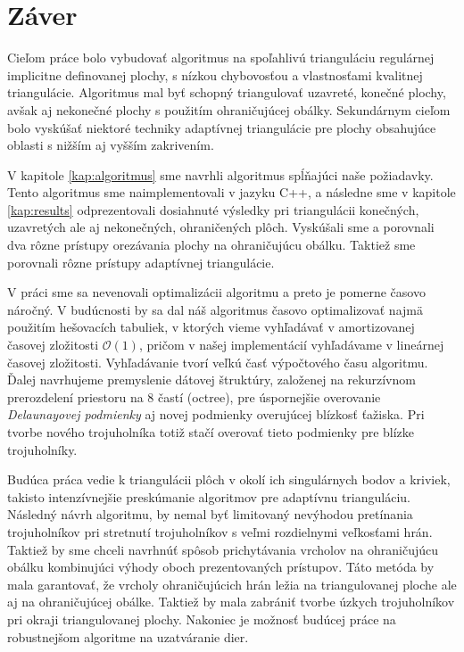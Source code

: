\chapter*{Záver}  %

Cieľom práce bolo vybudovať algoritmus na spoľahlivú trianguláciu regulárnej implicitne definovanej plochy, 
s nízkou chybovosťou a vlastnosťami kvalitnej triangulácie. Algoritmus mal byť schopný triangulovať
uzavreté, konečné plochy, avšak aj nekonečné plochy s použitím ohraničujúcej obálky. Sekundárnym cieľom bolo
vyskúšať niektoré techniky adaptívnej triangulácie pre plochy obsahujúce oblasti s nižším aj vyšším zakrivením.

V kapitole \ref{kap:algoritmus} sme navrhli algoritmus spĺňajúci naše požiadavky. Tento algoritmus sme
naimplementovali v jazyku C++, a následne sme v kapitole \ref{kap:results} odprezentovali dosiahnuté výsledky
pri triangulácii konečných, uzavretých ale aj nekonečných, ohraničených plôch. Vyskúšali sme a porovnali dva 
rôzne prístupy orezávania plochy na ohraničujúcu obálku. Taktiež sme porovnali rôzne prístupy adaptívnej 
triangulácie. 

V práci sme sa nevenovali optimalizácii algoritmu a preto je pomerne časovo náročný. V budúcnosti by 
sa dal náš algoritmus časovo optimalizovať najmä použitím hešovacích tabuliek, v ktorých vieme vyhľadávať 
v amortizovanej časovej zložitosti $\mathcal{O}(1)$, pričom v našej implementácií vyhľadávame v lineárnej časovej
zložitosti. Vyhľadávanie tvorí veľkú časť výpočtového času algoritmu. Ďalej navrhujeme 
premyslenie dátovej štruktúry, založenej na rekurzívnom prerozdelení priestoru na 8 častí (octree), pre 
úspornejšie overovanie \textit{Delaunayovej podmienky} aj novej podmienky overujúcej blízkosť ťažiska.
Pri tvorbe nového trojuholníka totiž stačí overovať tieto podmienky pre blízke trojuholníky.

Budúca práca vedie k triangulácii plôch v okolí ich singulárnych bodov a kriviek, takisto intenzívnejšie 
preskúmanie algoritmov pre adaptívnu trianguláciu. Následný návrh algoritmu, by nemal byť limitovaný nevýhodou pretínania
trojuholníkov pri stretnutí trojuholníkov s veľmi rozdielnymi veľkosťami hrán. Taktiež by sme chceli navrhnúť spôsob 
prichytávania vrcholov na ohraničujúcu obálku kombinujúci výhody oboch prezentovaných prístupov. Táto metóda by mala 
garantovať, že vrcholy ohraničujúcich hrán ležia na triangulovanej ploche ale aj na ohraničujúcej obálke. Taktiež 
by mala zabrániť tvorbe úzkych trojuholníkov pri okraji triangulovanej plochy.
Nakoniec je možnosť budúcej práce na robustnejšom algoritme na uzatváranie dier.